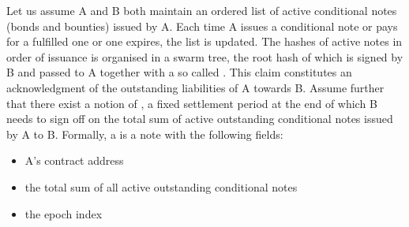 Let us assume A and B both maintain an ordered list of active conditional notes (bonds and bounties) issued by A.
Each time A issues a conditional note or pays for a fulfilled one or one expires, the list is updated.
The hashes of active notes in order of issuance is organised in a swarm tree, the
root hash of which is signed by B and passed to A together with a so called
. This claim constitutes an acknowledgment of
the outstanding liabilities of A towards B. Assume further that there exist a notion of ,
a fixed settlement period at the end of which B needs to sign off on the total sum of active
outstanding conditional notes issued by A to B.
Formally, a  is a note with the following fields:

\begin{itemize}
  \item A's contract address
  \item the total sum of all active outstanding conditional notes
  \item the epoch index
\end{itemize}
